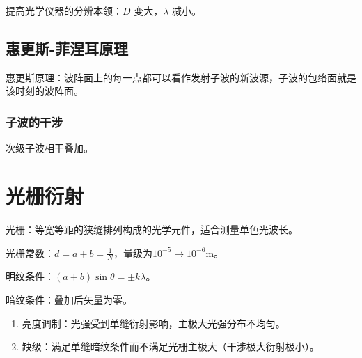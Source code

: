 提高光学仪器的分辨本领：$D$ 变大，$\lambda$ 减小。

\subsection{惠更斯-菲涅耳原理}

惠更斯原理：波阵面上的每一点都可以看作发射子波的新波源，子波的包络面就是该时刻的波阵面。

\subsubsection{子波的干涉}

次级子波相干叠加。

\section{光栅衍射}

光栅：等宽等距的狭缝排列构成的光学元件，适合测量单色光波长。

光栅常数：$d=a+b=\frac{1}{N}$，量级为$10^{-5}\to10^{-6}\mathrm{m}$。

明纹条件：$(a+b)\sin{\theta}=\pm{}k\lambda$。

暗纹条件：叠加后矢量为零。

\begin{enumerate}
    \item 亮度调制：光强受到单缝衍射影响，主极大光强分布不均匀。
    \item 缺级：满足单缝暗纹条件而不满足光栅主极大（干涉极大衍射极小）。
\end{enumerate}